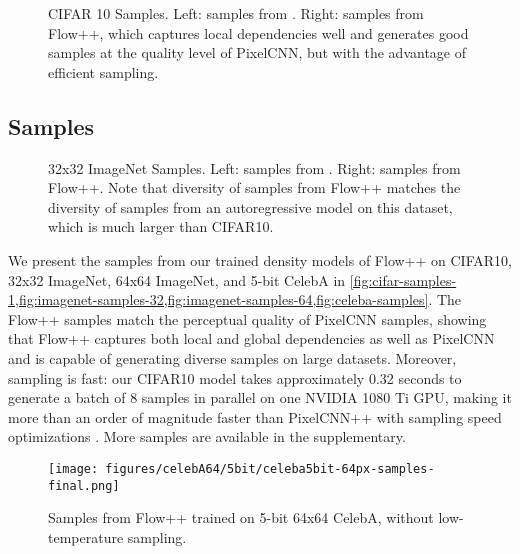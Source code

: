 \documentclass{article}
\begin{document}
\begin{figure*}[h]
\hspace{2.5mm}
\caption{CIFAR 10 Samples. Left: samples from  \citet{oord2016pixel}. Right: samples from Flow++, which captures local dependencies well and generates good samples at the quality level of PixelCNN, but with the advantage of efficient sampling.
}
\label{fig:cifar-samples-1}
\end{figure*}


\subsection{Samples}


\begin{figure*}[h!]
\hspace{3mm}
\caption{32x32 ImageNet Samples. Left: samples from \citet{oord2016pixel}. Right: samples from Flow++. Note that diversity of samples from Flow++ matches the diversity of samples from an autoregressive model on this dataset, which is much larger than CIFAR10.}
\label{fig:imagenet-samples-32}
\end{figure*}

We present the samples from our trained density models of Flow++ on CIFAR10, 32x32 ImageNet, 64x64 ImageNet, and 5-bit CelebA in \cref{fig:cifar-samples-1,fig:imagenet-samples-32,fig:imagenet-samples-64,fig:celeba-samples}. The Flow++ samples match the perceptual quality of PixelCNN samples, showing that Flow++ captures both local and global dependencies as well as PixelCNN and is capable of generating diverse samples on large datasets. Moreover, sampling is fast: our CIFAR10 model takes approximately 0.32 seconds to generate a batch of 8 samples in parallel on one NVIDIA 1080 Ti GPU, making it more than an order of magnitude faster than PixelCNN++ with sampling speed optimizations \citep{ramachandran2017fast}.
More samples are available in the supplementary.


\begin{figure}[!h]
\begin{center}
\texttt{[image: figures/celebA64/5bit/celeba5bit-64px-samples-final.png]}
\end{center}
\caption{Samples from Flow++ trained on 5-bit 64x64 CelebA, without low-temperature sampling.}
\label{fig:celeba-samples}
\end{figure}
\end{document}

